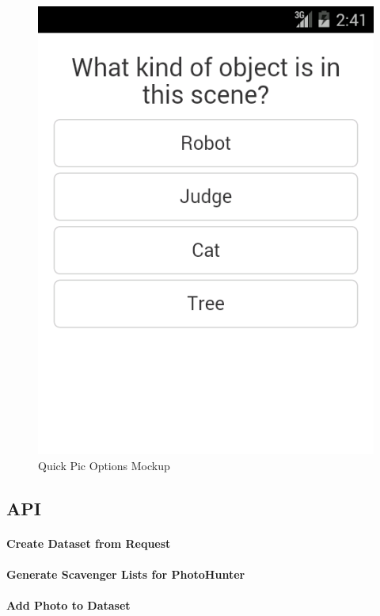 \documentclass{article}
\begin{document}
\begin{figure}[H]
\caption{Quick Pic Options Mockup}
\centering
\includegraphics[width =\textwidth, height=\textheight, keepaspectratio]{ss_quickpic_options}
\end{figure}

\subsection{API}

\paragraph{Create Dataset from Request}

\paragraph{Generate Scavenger Lists for PhotoHunter}

\paragraph{Add Photo to Dataset}
\end{document}
